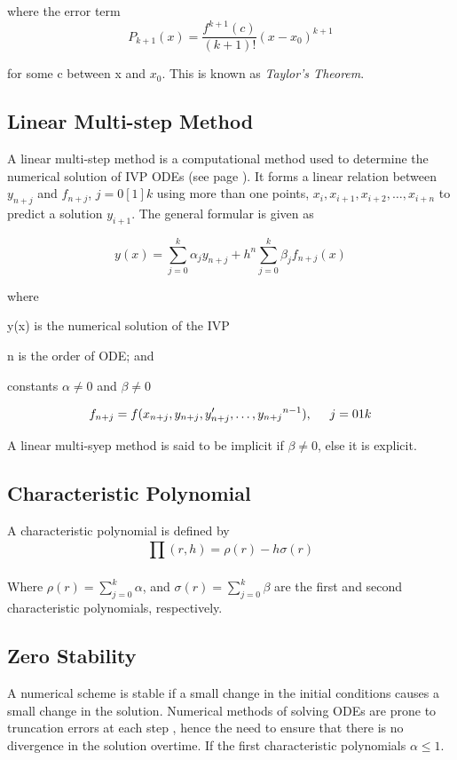 \documentclass[12pt]{report}
\begin{document}
	\noindent where the error term \begin{equation}
	P_{k+1}(x)=\frac{f^{k+1}(c)}{(k+1)!}(x-x_0)^{k+1}
	\end{equation}
	
	\noindent for some c between x and $x_0$. This is known as \textit{Taylor's Theorem}.
	
	
	\subsection{Linear Multi-step Method}
	A linear multi-step method is a computational method used to determine the numerical solution of IVP ODEs (see page \pageref{sec: Problems of ODE}). It forms a linear relation between $y_{n+j}$ and $f_{n+j}$, $j = 0[1]k$ using more than one points, $x_i,x_{i+1}, x_{i+2}, \dots, x_{i+n}$ to predict a solution $y_{i+1}$. The general formular is given as 

	\begin{equation}
	y(x) = \sum_{j=0}^{k}\alpha_jy_{n+j}+h^n\sum_{j=0}^{k}\beta_jf_{n+j}(x)
	\end{equation}
	
	\noindent where
	
	y(x) is the numerical solution of the IVP
	
	n is the order of ODE; and
	
	constants $\alpha \neq 0$ and $\beta \neq 0$ 

	$$f_{n+j} = f(x_{n+j}, y_{n+j}, y'_{n+j}, \dots, {y_{n+j}}^{n-1}), \hspace{5mm} j=0{1}k$$

	\medskip
	\noindent A linear multi-syep method is said to be implicit if $\beta\neq0$, else it is explicit.
	
	\subsection{Characteristic Polynomial}
	A characteristic polynomial is defined by
	\begin{equation}
	\prod_{}^{}(r,h)=\rho(r)-h\sigma(r)
	\end{equation}

	\noindent Where
	$\rho(r) = \sum_{j=0}^{k} \alpha$, and  $\sigma(r) = \sum_{j=0}^{k} \beta$ are the first and second characteristic polynomials, respectively.

	\subsection{Zero Stability}
	A numerical scheme is stable if a small change in the initial conditions causes a small change in the solution. Numerical methods of solving ODEs are prone to truncation errors at each step , hence the need to ensure that there is no divergence in the solution overtime. If the first characteristic polynomials $\alpha\leq1.$ 
	
\end{document}

